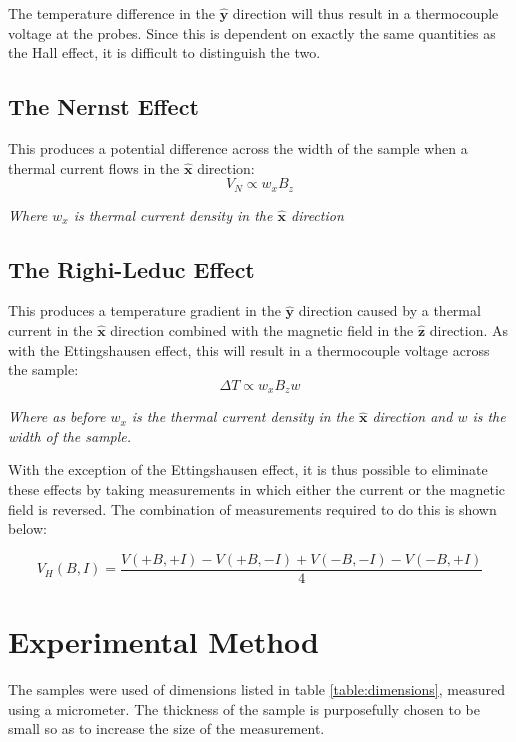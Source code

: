 \documentclass{article}
\newcommand{\supercite}[1]{\textsuperscript{\cite{#1}}}
\begin{document}
			\noindent The temperature difference in the $\hat{\mathbf{y}}$ direction will thus result in a thermocouple voltage at the probes. Since this is dependent on exactly the same quantities as the Hall effect, it is difficult to distinguish the two.
		
		\subsection{The Nernst Effect}
			This produces a potential difference across the width of the sample when a thermal current flows in the $\hat{\mathbf{x}}$ direction\supercite{lindbergHall}:
			\begin{equation}
				V_N \propto w_xB_z
			\end{equation}	
			\begin{center} \emph{Where $w_x$ is thermal current density in the $\hat{\mathbf{x}}$ direction} \end{center}
		
		\subsection{The Righi-Leduc Effect}
			This produces a temperature gradient in the $\hat{\mathbf{y}}$ direction caused by a thermal current in the $\hat{\mathbf{x}}$ direction combined with the magnetic field in the $\hat{\mathbf{z}}$ direction\supercite{lindbergHall}. As with the Ettingshausen effect, this will result in a thermocouple voltage across the sample:
			\begin{equation}
				\Delta T \propto w_xB_zw
			\end{equation}
			\begin{center} \emph{Where as before $w_x$ is the thermal current density in the $\hat{\mathbf{x}}$ direction and $w$ is the width of the sample.} \end{center}
		
		With the exception of the Ettingshausen effect, it is thus possible to eliminate these effects by taking measurements in which either the current or the magnetic field is reversed. The combination of measurements required to do this is shown below\supercite{lindbergHall}:
		
		\begin{equation} \label{eq:removeErrors}
			V_H(B,I) = \frac{V(+B,+I)-V(+B,-I)+V(-B,-I)-V(-B,+I)}{4}
		\end{equation}
		
	\section{Experimental Method}
		The samples were used of dimensions listed in table \ref{table:dimensions}, measured using a micrometer. The thickness of the sample is purposefully chosen to be small so as to increase the size of the measurement.
		
\end{document}
